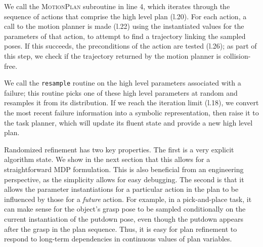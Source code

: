 We call the \textsc{MotionPlan} subroutine in line 4, which
iterates through the sequence of actions that comprise the high level plan (l.20).
For each action, a call to the motion planner is made (l.22) using the instantiated values
for the parameters of that action, to attempt to find a trajectory
linking the sampled poses. If this succeeds, the preconditions of the action
are tested (l.26); as part of this step, we check if the trajectory returned by the
motion planner is collision-free.

We call the \texttt{resample} routine on the high level parameters
associated with a failure; this routine picks one of these high level parameters at random and
resamples it from its distribution. If we reach the iteration limit (l.18),
we convert the most recent failure information into a symbolic representation, then raise it
to the task planner, which will update its fluent state and provide a new
high level plan.

Randomized refinement has two key properties. The first is a very explicit algorithm state.
We show in the next section that this allows for a straightforward MDP
formulation. This is also beneficial from an
engineering perspective, as the simplicity allows for easy debugging. The second is that
it allows the parameter instantiations for a particular action in
the plan to be influenced by those for a \emph{future} action. For example, in a
pick-and-place task, it can make sense for the object's grasp pose to be sampled
conditionally on the current instantiation of the putdown pose, even though the putdown
appears after the grasp in the plan sequence. Thus, it is easy for plan refinement to
respond to long-term dependencies in continuous values of plan variables.